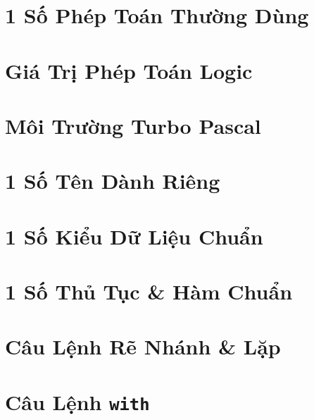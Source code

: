 \documentclass[oneside]{book}
\numberwithin{equation}{section}
\begin{document}
\section{1 Số Phép Toán Thường Dùng}


\section{Giá Trị Phép Toán Logic}


\section{Môi Trường Turbo Pascal}


\section{1 Số Tên Dành Riêng}


\section{1 Số Kiểu Dữ Liệu Chuẩn}


\section{1 Số Thủ Tục \& Hàm Chuẩn}


\section{Câu Lệnh Rẽ Nhánh \& Lặp}


\section{Câu Lệnh \texttt{with}}
\end{document}
